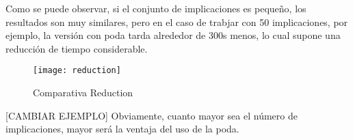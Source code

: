 Como se puede observar, si el conjunto de implicaciones es peque\~no, los resultados son muy similares, pero en el caso de trabjar con 50 implicaciones, por ejemplo, la versi\'on con poda tarda alrededor de 300s menos, lo cual supone una reducci\'on de tiempo considerable.

\begin{figure}[H]
    \centering
    \texttt{[image: reduction]}
    \caption{Comparativa Reduction}
    \label{fig:reduction}
\end{figure}
[CAMBIAR EJEMPLO]
Obviamente, cuanto mayor sea el n\'umero de implicaciones, mayor ser\'a la ventaja del uso de la poda.